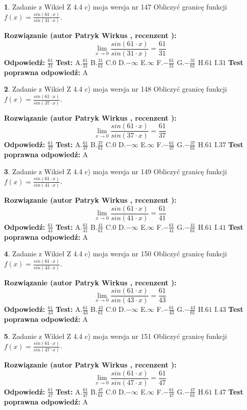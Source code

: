 \documentclass[12pt, a4paper]{article}
\theoremstyle{definition} %
\newtheorem{zad}{}
\newcommand{\zadStart}[1]{\begin{zad}#1\newline}
\newcommand{\zadStop}{\end{zad}}
\newcommand{\rozwStart}[2]{\noindent \textbf{Rozwiązanie (autor #1 , recenzent #2): }\newline}
\newcommand{\rozwStop}{\newline}
\newcommand{\odpStart}{\noindent \textbf{Odpowiedź:}\newline}
\newcommand{\odpStop}{\newline}
\newcommand{\testStart}{\noindent \textbf{Test:}\newline}
\newcommand{\testStop}{\newline}
\newcommand{\kluczStart}{\noindent \textbf{Test poprawna odpowiedź:}\newline}
\newcommand{\kluczStop}{\newline}
\begin{document}
\zadStart{Zadanie z Wikieł Z 4.4 c) moja wersja nr 147}
Obliczyć granicę funkcji $f(x)=\frac{sin(61\cdot x)}{sin(31\cdot x)}$.
\zadStop
\rozwStart{Patryk Wirkus}{}
$$\lim\limits_{x\to 0}\frac{sin(61\cdot x)}{sin(31\cdot x)}=
\frac{61}{31}$$
\rozwStop
\odpStart
$\frac{61}{31}$
\odpStop
\testStart
A.$\frac{61}{31}$
B.$\frac{31}{61}$
C.$0$
D.$-\infty$
E.$\infty$
F.$-\frac{61}{31}$
G.$-\frac{31}{61}$
H.$61$
I.$31$
\testStop
\kluczStart
A
\kluczStop



\zadStart{Zadanie z Wikieł Z 4.4 c) moja wersja nr 148}
Obliczyć granicę funkcji $f(x)=\frac{sin(61\cdot x)}{sin(37\cdot x)}$.
\zadStop
\rozwStart{Patryk Wirkus}{}
$$\lim\limits_{x\to 0}\frac{sin(61\cdot x)}{sin(37\cdot x)}=
\frac{61}{37}$$
\rozwStop
\odpStart
$\frac{61}{37}$
\odpStop
\testStart
A.$\frac{61}{37}$
B.$\frac{37}{61}$
C.$0$
D.$-\infty$
E.$\infty$
F.$-\frac{61}{37}$
G.$-\frac{37}{61}$
H.$61$
I.$37$
\testStop
\kluczStart
A
\kluczStop



\zadStart{Zadanie z Wikieł Z 4.4 c) moja wersja nr 149}
Obliczyć granicę funkcji $f(x)=\frac{sin(61\cdot x)}{sin(41\cdot x)}$.
\zadStop
\rozwStart{Patryk Wirkus}{}
$$\lim\limits_{x\to 0}\frac{sin(61\cdot x)}{sin(41\cdot x)}=
\frac{61}{41}$$
\rozwStop
\odpStart
$\frac{61}{41}$
\odpStop
\testStart
A.$\frac{61}{41}$
B.$\frac{41}{61}$
C.$0$
D.$-\infty$
E.$\infty$
F.$-\frac{61}{41}$
G.$-\frac{41}{61}$
H.$61$
I.$41$
\testStop
\kluczStart
A
\kluczStop



\zadStart{Zadanie z Wikieł Z 4.4 c) moja wersja nr 150}
Obliczyć granicę funkcji $f(x)=\frac{sin(61\cdot x)}{sin(43\cdot x)}$.
\zadStop
\rozwStart{Patryk Wirkus}{}
$$\lim\limits_{x\to 0}\frac{sin(61\cdot x)}{sin(43\cdot x)}=
\frac{61}{43}$$
\rozwStop
\odpStart
$\frac{61}{43}$
\odpStop
\testStart
A.$\frac{61}{43}$
B.$\frac{43}{61}$
C.$0$
D.$-\infty$
E.$\infty$
F.$-\frac{61}{43}$
G.$-\frac{43}{61}$
H.$61$
I.$43$
\testStop
\kluczStart
A
\kluczStop



\zadStart{Zadanie z Wikieł Z 4.4 c) moja wersja nr 151}
Obliczyć granicę funkcji $f(x)=\frac{sin(61\cdot x)}{sin(47\cdot x)}$.
\zadStop
\rozwStart{Patryk Wirkus}{}
$$\lim\limits_{x\to 0}\frac{sin(61\cdot x)}{sin(47\cdot x)}=
\frac{61}{47}$$
\rozwStop
\odpStart
$\frac{61}{47}$
\odpStop
\testStart
A.$\frac{61}{47}$
B.$\frac{47}{61}$
C.$0$
D.$-\infty$
E.$\infty$
F.$-\frac{61}{47}$
G.$-\frac{47}{61}$
H.$61$
I.$47$
\testStop
\kluczStart
A
\kluczStop
\end{document}
